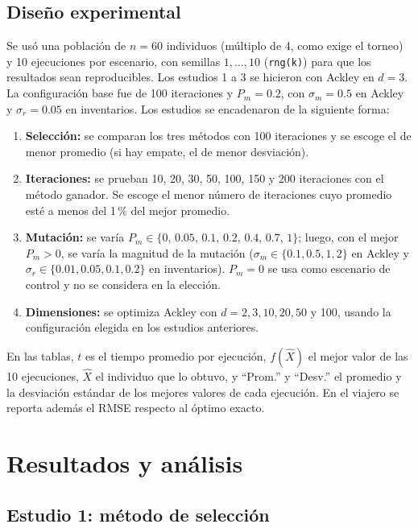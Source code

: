 \documentclass[conference]{IEEEtran}
\begin{document}
\subsection{Dise\~no experimental}
Se us\'o una poblaci\'on de $n=60$ individuos (m\'ultiplo de 4, como exige el torneo) y 10 ejecuciones por escenario, con semillas $1,\dots,10$ (\texttt{rng(k)}) para que los resultados sean reproducibles. Los estudios 1 a 3 se hicieron con Ackley en $d=3$. La configuraci\'on base fue de 100 iteraciones y $P_m=0.2$, con $\sigma_m=0.5$ en Ackley y $\sigma_r=0.05$ en inventarios. Los estudios se encadenaron de la siguiente forma:
\begin{enumerate}
\item \textbf{Selecci\'on:} se comparan los tres m\'etodos con 100 iteraciones y se escoge el de menor promedio (si hay empate, el de menor desviaci\'on).
\item \textbf{Iteraciones:} se prueban 10, 20, 30, 50, 100, 150 y 200 iteraciones con el m\'etodo ganador. Se escoge el menor n\'umero de iteraciones cuyo promedio est\'e a menos del 1\,\% del mejor promedio.
\item \textbf{Mutaci\'on:} se var\'ia $P_m\in\{0,\,0.05,\,0.1,\,0.2,\,0.4,\,0.7,\,1\}$; luego, con el mejor $P_m>0$, se var\'ia la magnitud de la mutaci\'on ($\sigma_m\in\{0.1,0.5,1,2\}$ en Ackley y $\sigma_r\in\{0.01,0.05,0.1,0.2\}$ en inventarios). $P_m=0$ se usa como escenario de control y no se considera en la elecci\'on.
\item \textbf{Dimensiones:} se optimiza Ackley con $d=2,3,10,20,50$ y 100, usando la configuraci\'on elegida en los estudios anteriores.
\end{enumerate}
En las tablas, $t$ es el tiempo promedio por ejecuci\'on, $f(\hat{X})$ el mejor valor de las 10 ejecuciones, $\hat{X}$ el individuo que lo obtuvo, y ``Prom.'' y ``Desv.'' el promedio y la desviaci\'on est\'andar de los mejores valores de cada ejecuci\'on. En el viajero se reporta adem\'as el RMSE respecto al \'optimo exacto.

\section{Resultados y an\'alisis}

\subsection{Estudio 1: m\'etodo de selecci\'on}



\end{document}
